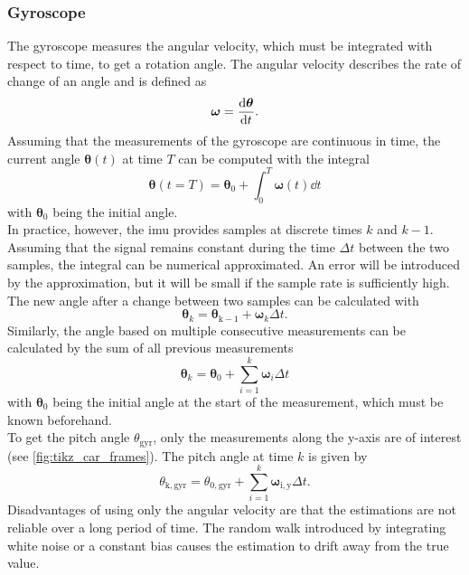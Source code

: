 \subsubsection{Gyroscope}
The gyroscope measures the angular velocity, which must be integrated with respect to time, to get a rotation angle.
The angular velocity describes the rate of change of an angle and is defined as
\begin{equation}
	\boldsymbol{\omega}  =  \dv{\boldsymbol{\theta}}{t}.
\end{equation}
Assuming that the measurements of the gyroscope are continuous in time, the current angle $\boldsymbol{\theta}(t)$ at time $T$ can be computed with the integral
\begin{equation}
	\boldsymbol{\theta}(t = T) = \boldsymbol{\theta}_0 + \int_0^T \boldsymbol{\omega}(t)\dd{t}
\end{equation}
with $\boldsymbol{\theta}_0$ being the initial angle.\\
In practice, however, the \gls{imu} provides samples at discrete times $k$ and $k-1$.
Assuming that the signal remains constant during the time $\Delta t$ between the two samples, the integral can be numerical approximated.
An error will be introduced by the approximation, but it will be small if the sample rate is sufficiently high.
The new angle after a change between two samples can be calculated with
\begin{equation}
	\boldsymbol{\theta}_k = \boldsymbol{\theta}_\mathrm{k - 1} + \boldsymbol{\omega}_k\Delta t.
\end{equation}
Similarly, the angle based on multiple consecutive measurements can be calculated by the sum of all previous measurements
\begin{equation}
	\boldsymbol{\theta}_k = \boldsymbol{\theta}_0 + \sum_{i = 1}^k \boldsymbol{\omega}_i \Delta t
\end{equation}
with $\boldsymbol{\theta}_0$ being the initial angle at the start of the measurement, which must be known beforehand.\\
To get the pitch angle $\theta_\mathrm{gyr}$, only the measurements along the y-axis are of interest (see \cref{fig:tikz_car_frames}).
The pitch angle at time $k$ is given by
\begin{equation}
	\label{eq:ang_from_gyro}
	\theta_\mathrm{k, gyr} = \theta_{0, \mathrm{gyr} } + \sum_{i = 1}^{k} \boldsymbol{\omega}_\mathrm{i, y} \Delta t.
\end{equation}
Disadvantages of using only the angular velocity are that the estimations are not reliable over a long period of time.
The random walk introduced by integrating white noise or a constant bias causes the estimation to drift away from the true value.


